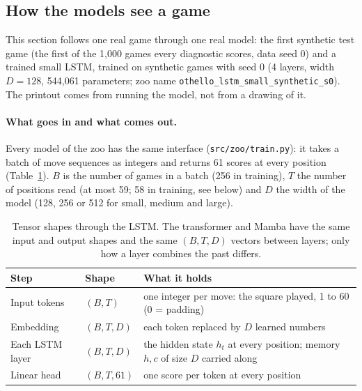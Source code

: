 \documentclass[11pt]{scrartcl}
\begin{document}
\subsection{How the models see a game}
\label{sec:see}

This section follows one real game through one real model: the first synthetic test game (the first of the
1,000 games every diagnostic scores, data seed 0) and a trained small LSTM, trained on synthetic games with
seed 0 (4 layers, width $D=128$, 544,061 parameters; zoo name \texttt{othello\_lstm\_small\_synthetic\_s0}). The printout comes from running the model, not from a drawing
of it.

\paragraph{What goes in and what comes out.} Every model of the zoo has the same interface
(\texttt{src/zoo/train.py}): it takes a batch of move sequences as integers and returns 61 scores at every
position (Table~\ref{tab:shapes}). $B$ is the number of games in a batch (256 in training), $T$ the number of
positions read (at most 59; 58 in training, see below) and $D$ the width of the model (128, 256 or 512 for
small, medium and large).

\begin{table}[H]
    \centering
    \small
    \begin{tabular}{l l >{\raggedright\arraybackslash}p{9.6cm}}
    \toprule
    Step & Shape & What it holds \\
    \midrule
    Input tokens & $(B, T)$ & one integer per move: the square played, 1 to 60 (0 = padding) \\
    Embedding & $(B, T, D)$ & each token replaced by $D$ learned numbers \\
    Each LSTM layer & $(B, T, D)$ & the hidden state $h_t$ at every position; memory $h, c$ of size $D$ carried along \\
    Linear head & $(B, T, 61)$ & one score per token at every position \\
    \bottomrule
    \end{tabular}
    \caption{Tensor shapes through the LSTM. The transformer and Mamba have the same input and output shapes
    and the same $(B, T, D)$ vectors between layers; only how a layer combines the past differs.}
    \label{tab:shapes}
\end{table}
\end{document}

